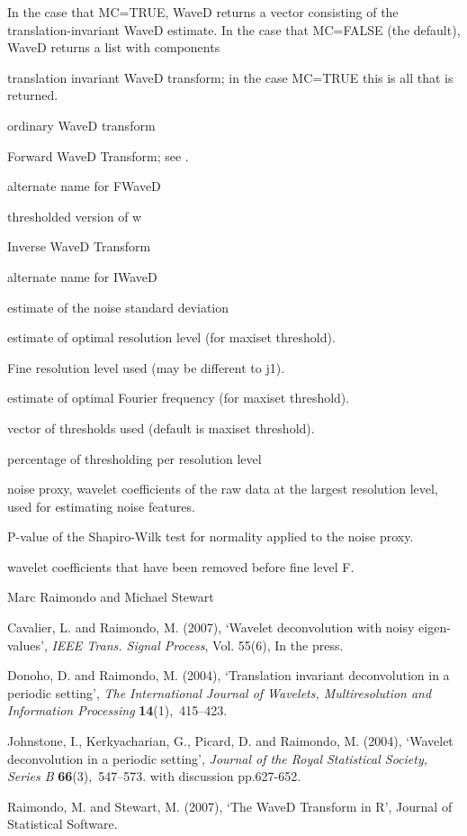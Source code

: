 \begin{Value}
In the case that MC=TRUE, WaveD returns a vector consisting of the translation-invariant WaveD estimate.
In the case that MC=FALSE (the default), WaveD returns a list with components
\begin{ldescription}
\item[\code{waved}] translation invariant WaveD transform; in the case MC=TRUE this is all that is returned.
\item[\code{ordinary}] ordinary WaveD transform
\item[\code{FWaveD}] Forward WaveD Transform; see .
\item[\code{w}] alternate name for FWaveD
\item[\code{w.thr}] thresholded version of w
\item[\code{IWaveD}] Inverse WaveD Transform
\item[\code{iw}] alternate name for IWaveD
\item[\code{s}] estimate of the noise standard deviation
\item[\code{j1}] estimate of optimal resolution level (for maxiset threshold).
\item[\code{F}] Fine resolution level used (may be different to j1).
\item[\code{M}] estimate of optimal Fourier frequency (for maxiset threshold).
\item[\code{thr}] vector of thresholds used (default is maxiset threshold).
\item[\code{percent}] percentage of thresholding per resolution level
\item[\code{noise}] noise proxy, wavelet coefficients of the raw data at the largest resolution level, used for estimating noise features.
\item[\code{ps}] P-value of the Shapiro-Wilk test for normality applied to the noise proxy.
\item[\code{residuals}] wavelet coefficients that have been removed before fine level F.
\end{ldescription}
\end{Value}
\begin{Author}\relax
Marc Raimondo and Michael Stewart
\end{Author}
\begin{References}\relax
Cavalier, L. and Raimondo, M.  (2007), `Wavelet deconvolution with noisy eigen-values', {\em IEEE Trans. Signal
Process}, Vol. 55(6), In the press.

Donoho, D. and Raimondo, M.  (2004),
`Translation invariant deconvolution in a periodic setting', {\em The
International Journal of Wavelets, Multiresolution and Information
Processing} {\bf 14}(1),~415--423.

Johnstone, I., Kerkyacharian, G., Picard, D. and Raimondo, M.  (2004), 
`Wavelet deconvolution in a periodic
setting', {\em Journal of the Royal Statistical Society, Series B} {\bf
66}(3),~547--573.  with discussion pp.627-652.

Raimondo, M. and Stewart, M. (2007),
`The WaveD Transform in R', Journal of Statistical Software.
\end{References}
